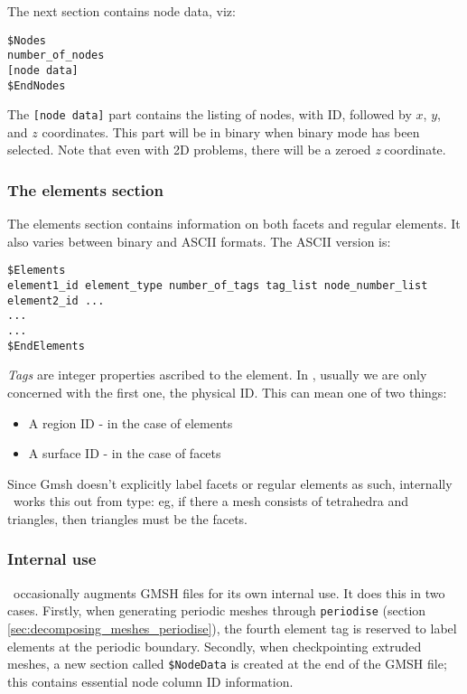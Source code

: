 The next section contains node data, viz:
\begin{lstlisting}
$Nodes
number_of_nodes
[node data]
$EndNodes
\end{lstlisting}

The \lstinline+[node data]+ part contains the listing of nodes, with ID,
followed by $x$, $y$, and $z$ coordinates. This part
will be in binary when binary mode has been selected. Note that even with 2D
problems, there will be a zeroed \textit{z} coordinate.



\subsubsection*{The elements section}\label{sec:gmsh_elements_section}

The elements section contains information on both facets and regular
elements. It also varies between binary and ASCII formats. The ASCII version
is:

\begin{lstlisting}
$Elements
element1_id element_type number_of_tags tag_list node_number_list
element2_id ...
...
...
$EndElements
\end{lstlisting}
\textit{Tags} are integer properties ascribed to the element. In \fluidity,
usually we are only concerned with the first one, the physical ID. This can mean
one of two things:

\begin{itemize}
\item A region ID - in the case of elements
\item A surface ID - in the case of facets
\end{itemize}

Since Gmsh doesn't explicitly label facets or regular elements as such,
internally \fluidity\ works this out from type: eg, if there a mesh consists
of tetrahedra and triangles, then triangles must be the facets.

\subsubsection*{Internal use }
\label{sec:gmsh_internal_use_section}

\fluidity\ occasionally augments GMSH files for its own internal use. It
does this in two cases. Firstly, when generating periodic meshes 
through \lstinline+periodise+ (section \ref{sec:decomposing_meshes_periodise}), the
fourth element tag is reserved to label elements at the periodic boundary.
Secondly, when checkpointing extruded meshes, a new section called
\lstinline+$NodeData+ is created at the end of the GMSH file; this contains
essential node column ID information.
 
